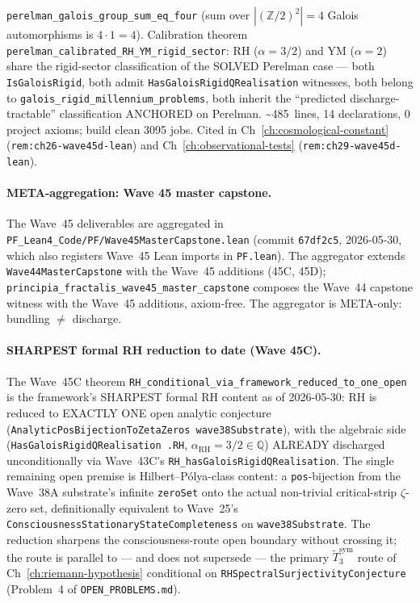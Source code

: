 \begin{itemize}
  \texttt{perelman\_galois\_group\_sum\_eq\_four} (sum over
  $|(\mathbb{Z}/2)^2| = 4$ Galois automorphisms is $4 \cdot 1 = 4$).
  Calibration theorem
  \texttt{perelman\_calibrated\_RH\_YM\_rigid\_sector}: RH
  ($\alpha = 3/2$) and YM ($\alpha = 2$) share the rigid-sector
  classification of the SOLVED Perelman case --- both
  \texttt{IsGaloisRigid}, both admit \texttt{HasGaloisRigidQRealisation}
  witnesses, both belong to
  \texttt{galois\_rigid\_millennium\_problems}, both inherit the
  ``predicted discharge-tractable'' classification ANCHORED on
  Perelman. \textasciitilde 485~lines, 14 declarations, 0 project
  axioms; build clean 3095 jobs. Cited in
  Ch~\ref{ch:cosmological-constant} (\texttt{rem:ch26-wave45d-lean})
  and Ch~\ref{ch:observational-tests}
  (\texttt{rem:ch29-wave45d-lean}).
\end{itemize}

\paragraph{META-aggregation: Wave 45 master capstone.} The Wave~45
deliverables are aggregated in
\texttt{PF\_Lean4\_Code/PF/Wave45MasterCapstone.lean} (commit
\texttt{67df2c5}, 2026-05-30, which also registers Wave~45 Lean
imports in \texttt{PF.lean}). The aggregator extends
\texttt{Wave44MasterCapstone} with the Wave~45 additions (45C, 45D);
\texttt{principia\_fractalis\_wave45\_master\_capstone} composes
the Wave~44 capstone witness with the Wave~45 additions, axiom-free.
The aggregator is META-only: bundling $\neq$ discharge.

\paragraph{SHARPEST formal RH reduction to date (Wave 45C).}
The Wave~45C theorem
\texttt{RH\_conditional\_via\_framework\_reduced\_to\_one\_open}
is the framework's SHARPEST formal RH content as of 2026-05-30:
RH is reduced to EXACTLY ONE open analytic conjecture
(\texttt{AnalyticPosBijectionToZetaZeros wave38Substrate}),
with the algebraic side
(\texttt{HasGaloisRigidQRealisation .RH}, $\alpha_{\mathrm{RH}}
= 3/2 \in \mathbb{Q}$) ALREADY discharged unconditionally via
Wave~43C's \texttt{RH\_hasGaloisRigidQRealisation}. The single
remaining open premise is Hilbert--P\'olya-class content: a
\texttt{pos}-bijection from the Wave~38A substrate's infinite
\texttt{zeroSet} onto the actual non-trivial critical-strip
$\zeta$-zero set, definitionally equivalent to Wave~25's
\texttt{ConsciousnessStationaryStateCompleteness} on
\texttt{wave38Substrate}. The reduction sharpens the
consciousness-route open boundary without crossing it; the route
is parallel to --- and does not supersede --- the primary
$\widetilde{T}_3^{\mathrm{sym}}$ route of
Ch~\ref{ch:riemann-hypothesis} conditional on
\texttt{RHSpectralSurjectivityConjecture} (Problem~4 of
\texttt{OPEN\_PROBLEMS.md}).

